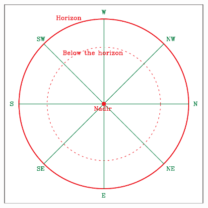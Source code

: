 \documentclass[12pt]{article}
\begin{document}
\begin{enumerate}
\begin{center}
\begin{minipage}{0.4\textwidth}
\begin{center}
					\includegraphics[width=0.8\textwidth]{botsky-crop.pdf}
				\end{center}
			\end{minipage}
		\end{center}
		
	\end{enumerate}
	
	
		
		
		
	
\end{document}
